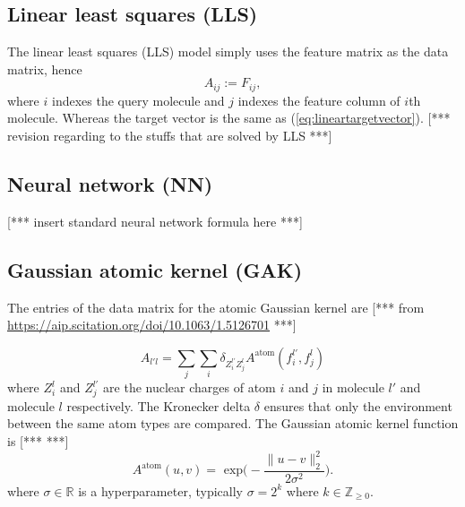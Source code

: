 \documentclass[12pt]{article}
\def\D{\displaystyle}
\def\att{                    %
        \marginpar[ \hspace*{\fill} \raisebox{-0.2em}{\rule{2mm}{1.2em}} ]
        {\raisebox{-0.2em}{\rule{2mm}{1.2em}} }
        }
\def\at#1{[*** \att #1 ***]}  %
\begin{document}
\subsection{Linear least squares (LLS)}
\label{subsec:LLS}
The linear least squares (LLS) model simply uses the feature matrix as the data matrix, hence
\begin{equation}
	\label{eq:lls}
	A_{ij} := F_{ij},
\end{equation}
where $i$ indexes the query molecule and $j$ indexes the feature column of $i$th molecule. Whereas the target vector is the same as (\ref{eq:lineartargetvector}).
\at{revision regarding to the stuffs that are solved by LLS}

\subsection{Neural network (NN)}
\label{subsec:NN}
\at{insert standard neural network formula here}

\subsection{Gaussian atomic kernel (GAK)}
The entries of the data matrix for the atomic Gaussian kernel are \at{\cite[Eq. (10)]{Faber et al} from \url{https://aip.scitation.org/doi/10.1063/1.5126701}}
\iffalse
\begin{equation}
	A_{l' l} = \sum_P \sum_{Z^{l'}_i = P} \sum_{Z^{l}_j = P} A^\text{atom}(f^{l'}_i, f^l_j)
	\label{eq:gaussian_atom}
\end{equation}
\fi
\begin{equation}
	A_{l'l} = \sum_j \sum_i \delta_{Z_i^{l'}Z_j^{l}} A^\text{atom}(f_i^{l'}, f_j^l)
	\label{eq:gaussian_atom}
\end{equation}
where $Z_i^l$ and $Z_j^{l'}$ are the nuclear charges of atom $i$ and $j$ in molecule $l'$ and molecule $l$ respectively. The Kronecker delta $\delta$ ensures that only the environment between the same atom types are compared. The Gaussian atomic kernel function is \at{\cite[Eq. (26)]{Faber et al}}
\begin{equation}
	A^\text{atom}(u, v) = \text{ exp}\Big( - \frac{\|u - v \|^2_2}{2 \sigma^2} \Big).
\end{equation}
where $\sigma \in \mathbb{R}$ is a hyperparameter, typically $\sigma = 2^k$ where $k \in \mathbb{Z}_{\geq 0}$.

\iffalse
&= \frac{\D \left(\sum_{k\in K} \frac{E_k + \sum_l \theta_{kl} \phi_{kl}(w)}{D_k(w)} / S_K(w)\right) - \left(E_j + \sum_l \theta_{jl} \phi_{jl}(w)\right)}{D_j(w)S_K(w)-1}, \\
\fi
\end{document}
